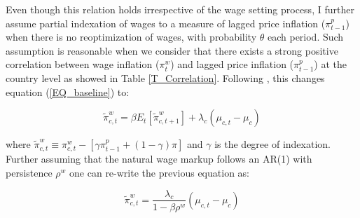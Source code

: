 \documentclass[12pt]{article}
\begin{document}
\begin{appendices}
Even though this relation holds irrespective of the wage setting process, I further assume partial indexation of wages to a measure of lagged price inflation ($\pi^p_{t-1}$) when there is no reoptimization of wages, with probability $\theta$ each period. Such assumption is reasonable when we consider that there exists a strong positive correlation between wage inflation ($\pi_t^w$) and lagged price inflation ($\pi^p_{t-1}$) at the country level as showed in Table \ref{T_Correlation}. Following \cite{Gali2019}, this changes equation (\ref{EQ_baseline}) to:

\begin{equation*}
    \tilde{\pi}_{c,t}^{w} = \beta E_t [\tilde{\pi}_{c,t+1}^{w}] + \lambda_c (\mu_{c,t} - \mu_c)
\end{equation*}

where $\tilde{\pi}_{c,t}^{w} \equiv \pi^w_{c,t} - [\gamma \pi^p_{t-1} + (1-\gamma)\pi]$ and $\gamma$ is the degree of indexation. Further assuming that the natural wage markup follows an AR(1) with persistence $\rho^w$ one can re-write the previous equation as:

\begin{equation}
    \label{EQ_baseline2}
    \tilde{\pi}_{c,t}^{w} = \dfrac{\lambda_c}{1 - \beta \rho^w}  (\mu_{c,t} - \mu_c)
\end{equation}


\end{appendices}
\end{document}
